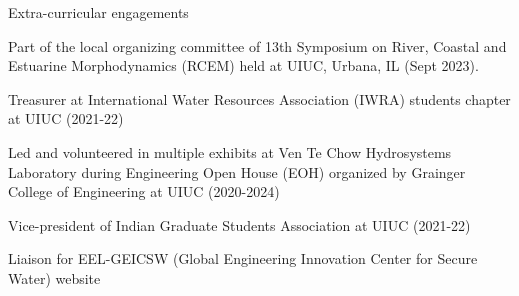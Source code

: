 \documentclass{resume} %
\newcommand{\tab}[1]{\hspace{.2667\textwidth}\rlap{#1}}
\newcommand{\itab}[1]{\hspace{0em}\rlap{#1}}
\begin{document}
\begin{rSection}{Extra-curricular engagements}
\item Part of the local organizing committee of 13th Symposium on River, Coastal and Estuarine Morphodynamics (RCEM) held at UIUC, Urbana, IL (Sept 2023). 
\item Treasurer at International Water Resources Association (IWRA) students chapter at UIUC (2021-22)
\item Led and volunteered in multiple exhibits at Ven Te Chow Hydrosystems Laboratory during Engineering Open House (EOH) organized by Grainger College of Engineering at UIUC (2020-2024) 
\item Vice-president of Indian Graduate Students Association at UIUC (2021-22)
\item Liaison for EEL-GEICSW (Global Engineering
Innovation Center for Secure Water) website 
\end{rSection}



\end{document}
